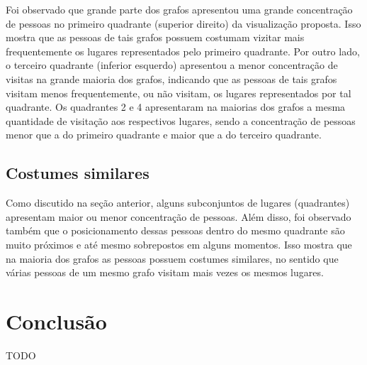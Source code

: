 \documentclass[12pt]{article}
\begin{document}
Foi observado que grande parte dos grafos apresentou uma grande concentração de pessoas no primeiro quadrante (superior direito) da visualização proposta. Isso mostra que as pessoas de tais grafos possuem costumam vizitar mais frequentemente os lugares representados pelo primeiro quadrante. Por outro lado, o terceiro quadrante (inferior esquerdo) apresentou a menor concentração de visitas na grande maioria dos grafos, indicando que as pessoas de tais grafos visitam menos frequentemente, ou não visitam, os lugares representados por tal quadrante. Os quadrantes 2 e 4 apresentaram na maiorias dos grafos a mesma quantidade de visitação aos respectivos lugares, sendo a concentração de pessoas menor que a do primeiro quadrante e maior que a do terceiro quadrante.

\subsection{Costumes similares}

Como discutido na seção anterior, alguns subconjuntos de lugares (quadrantes) apresentam maior ou menor concentração de pessoas. Além disso, foi observado também que o posicionamento dessas pessoas dentro do mesmo quadrante são muito próximos e até mesmo sobrepostos em alguns momentos. Isso mostra que na maioria dos grafos as pessoas possuem costumes similares, no sentido que várias pessoas de um mesmo grafo visitam mais vezes os mesmos lugares.

\section{Conclusão}

TODO


\footnotesize


\end{document}
